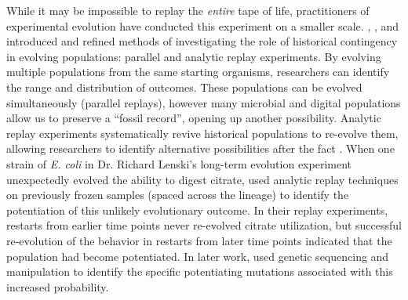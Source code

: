 While it may be impossible to replay the \textit{entire} tape of life, practitioners of experimental evolution have conducted this experiment on a smaller scale. 
\cite{travisanoExperimentalTestsRoles1995}, \cite{wagenaarInfluenceChanceHistory2004a}, and \citet{blountHistoricalContingencyEvolution2008} introduced and refined methods of investigating the role of historical contingency in evolving populations: parallel and analytic replay experiments.
By evolving multiple populations from the same starting organisms, researchers can identify the range and distribution of outcomes.
These populations can be evolved simultaneously (parallel replays), however many microbial and digital populations allow us to preserve a ``fossil record'', opening up another possibility.
Analytic replay experiments systematically revive historical populations to re-evolve them, allowing researchers to identify alternative possibilities after the fact \citep{blountContingencyDeterminismEvolution2018}.
When one strain of \textit{E. coli} in Dr. Richard Lenski's long-term evolution experiment \citep{lenskiLongtermExperimentalEvolution1991} unexpectedly evolved the ability to digest citrate,  
\citet{blountHistoricalContingencyEvolution2008} used analytic replay techniques on previously frozen samples (spaced across the lineage) to identify the potentiation of this unlikely evolutionary outcome.
In their replay experiments, restarts from earlier time points never re-evolved citrate utilization, but successful re-evolution of the behavior in restarts from later time points indicated that the population had become potentiated. %
In later work, \citet{blountGenomicAnalysisKey2012} used genetic sequencing and manipulation to identify the specific potentiating mutations associated with this increased probability.

